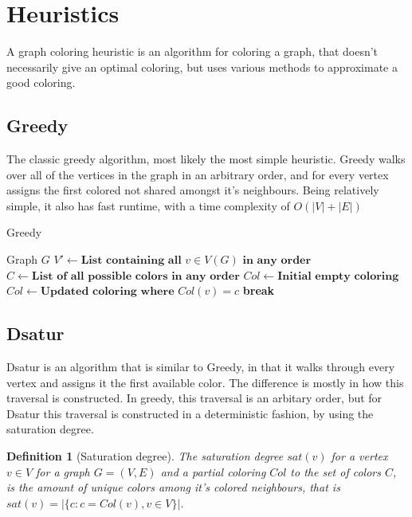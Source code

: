 \documentclass{amsart}
\newtheorem{definition}{Definition}[section]
\newcommand{\algorithmicbreak}{\textbf{break}}
\newcommand{\BREAK}{\STATE \algorithmicbreak}
\begin{document}
\section{Heuristics}
\label{sec:Heuristics}

A graph coloring heuristic is an algorithm for coloring a graph, that doesn't
necessarily give an optimal coloring, but uses various methods to approximate a
good coloring.

\subsection{Greedy}
The classic greedy algorithm, most likely the most simple heuristic. Greedy
walks over all of the vertices in the graph in an arbitrary order, and for every
vertex assigns the first colored not shared amongst it's neighbours. Being
relatively simple, it also has fast runtime, with a time complexity 
of $O(|V|+|E|)$ \cite{Constructive}

\begin{algorithm}[H]
  \caption{Greedy}
  \label{alg:greedy}
  \begin{algorithmic}[1]
    \REQUIRE Graph $G$
      \STATE $V' \leftarrow \textbf{List containing all $v \in V(G)$ in any order}$
      \STATE $C \leftarrow \textbf{List of all possible colors in any order}$
      \STATE $Col \leftarrow \textbf{Initial empty coloring}$
                \STATE $Col \leftarrow \textbf{Updated coloring where $Col(v) =
                c$}$
                \BREAK
            \ENDIF
        \ENDFOR
    \ENDFOR
  \end{algorithmic}
\end{algorithm}
\subsection{Dsatur}

Dsatur is an algorithm that is similar to Greedy, in that it walks through every
vertex and assigns it the first available color. The difference is mostly in
how this traversal is constructed. In greedy, this traversal is an arbitary
order, but for Dsatur this traversal is constructed in a deterministic fashion,
by using the saturation degree.

\begin{definition}[Saturation degree]
    The saturation degree $sat(v)$ for a vertex $v \in V$ for a graph $G =
    (V,E)$ and a partial coloring $Col$ to the set of colors $C$, is the amount of unique colors among
    it's colored neighbours, that is $sat(v) = |\{c  : c = Col(v), v \in V \}|$.
\end{definition}
\end{document}
